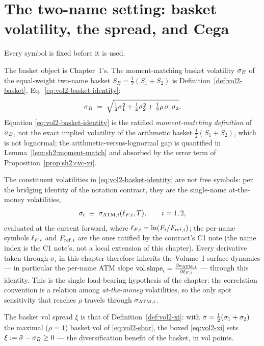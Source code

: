 \section{The two-name setting: basket volatility, the spread, and Cega}
\label{sec:sh2:setting}

Every symbol is fixed before it is used.

The basket object is Chapter~1's. The moment-matching basket volatility
$\sigma_B$ of the equal-weight two-name basket $S_B = \tfrac12(S_1 + S_2)$ is
Definition~\ref{def:vol2-basket}, Eq.~\eqref{eq:vol2-basket-identity}:
\[
  \sigma_B \;=\; \sqrt{\tfrac14 \sigma_1^2 + \tfrac14 \sigma_2^2
                  + \tfrac12 \rho\, \sigma_1 \sigma_2}.
\]
Equation \eqref{eq:vol2-basket-identity} is the ratified
\emph{moment-matching definition} of $\sigma_B$, not the exact implied
volatility of the arithmetic basket $\tfrac12(S_1 + S_2)$, which is not
lognormal; the arithmetic-versus-lognormal gap is quantified in
Lemma~\ref{lem:sh2:moment-match} and absorbed by the error term of
Proposition~\ref{prop:sh2:cvc-xi}.

The constituent volatilities in \eqref{eq:vol2-basket-identity} are not free
symbols: per the bridging identity of the notation contract, they are the
single-name at-the-money volatilities,
\begin{equation}\label{eq:sh2:C1}
  \sigma_i \;\equiv\; \sigma_{\mathrm{ATM},i}(\ell_{F,i}, T), \qquad i = 1, 2,
\end{equation}
evaluated at the current forward, where $\ell_{F,i} = \ln(F_i / F_{\mathrm{ref},i})$;
the per-name symbols $\ell_{F,i}$ and $F_{\mathrm{ref},i}$ are the ones ratified by the
contract's C1 note (the name index is the C1 note's, not a local extension
of this chapter). Every derivative taken through $\sigma_i$ in this chapter therefore
inherits the Volume~I surface dynamics --- in particular the per-name ATM
slope $\mathrm{vol.slope}_i = \frac{\partial \sigma_{\mathrm{ATM},i}}{\partial \ell_{F,i}}$ --- through this identity.
This is the single load-bearing hypothesis of the chapter: the correlation
convention is a relation among \emph{at-the-money} volatilities, so the only
spot sensitivity that reaches $\rho$ travels through $\sigma_{\mathrm{ATM},i}$.

The basket vol spread $\xi$ is that of Definition~\ref{def:vol2-xi}: with
$\bar\sigma = \tfrac12(\sigma_1 + \sigma_2)$ the maximal ($\rho = 1$) basket
vol of \eqref{eq:vol2-sbar}, the boxed \eqref{eq:vol2-xi} sets
$\xi := \bar\sigma - \sigma_B \ge 0$ --- the diversification benefit of the
basket, in vol points.

